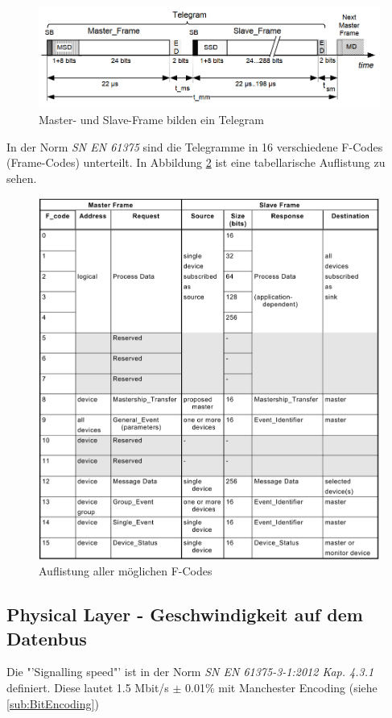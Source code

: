\begin{figure}[H]
    \centering
    \includegraphics[width=0.85\linewidth]{Figures/Chap2/Grundlagen/MVB_DOKU/Frames und Telegramme/Fig39_Telegamm_definition.png}
    \caption{Master- und Slave-Frame bilden ein Telegram}
    \label{fig:Fig39_Telegamm_definition.png}
\end{figure}

In der Norm \textit{SN EN 61375} sind die Telegramme in 16 verschiedene F-Codes (Frame-Codes) unterteilt. In Abbildung \ref{fig:FCodeListe} ist eine tabellarische Auflistung zu sehen. 

\begin{figure}[H]
    \centering
    \includegraphics[width=0.9\linewidth]{Figures/Chap2/Grundlagen/MVB_DOKU/Frames und Telegramme/F-Code Liste.png}
    \caption{Auflistung aller möglichen F-Codes}
    \label{fig:FCodeListe}
\end{figure}

\subsection{Physical Layer - Geschwindigkeit auf dem Datenbus}
\label{sub:GeschwindigkeitDatenbus}
Die "'Signalling speed"' ist in der Norm \textit{SN EN 61375-3-1:2012 Kap. 4.3.1} definiert. Diese lautet 1.5 Mbit/s $\pm$ 0.01\% mit Manchester Encoding (siehe \ref{sub:BitEncoding})

